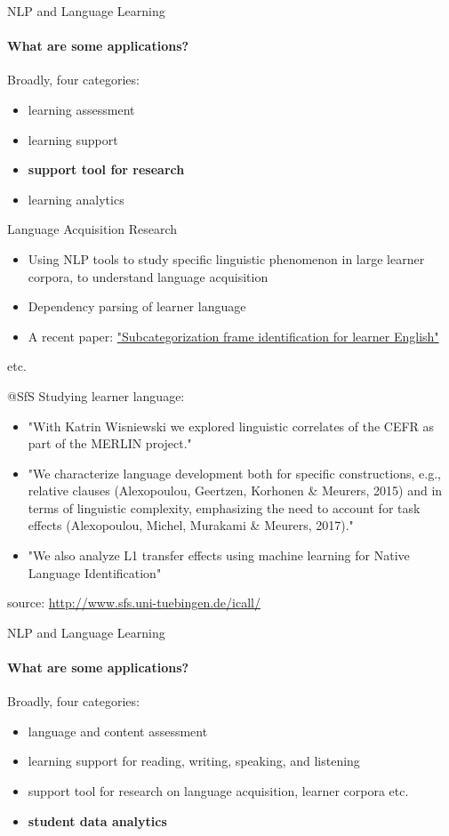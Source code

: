 \documentclass{beamer}
\begin{document}
\begin{frame}{NLP and Language Learning}
\framesubtitle{What are some applications?}
Broadly, four categories:
\begin{itemize}
    \item learning assessment
    \item learning support 
    \item \textbf{support tool for research}
    \item learning analytics
\end{itemize}
\end{frame}

\begin{frame}{Language Acquisition Research}
    \begin{itemize}
        \item Using NLP tools to study specific linguistic phenomenon in large learner corpora, to understand language acquisition
        \item Dependency parsing of learner language
        \item A recent paper: \href{https://www.jbe-platform.com/content/journals/10.1075/ijcl.18097.hua}{"Subcategorization frame identification for learner English"}
    \end{itemize}
    etc. 
\end{frame}

\begin{frame}{@SfS}
Studying learner language: 
    \begin{itemize}
        \item "With Katrin Wisniewski we explored linguistic correlates of the CEFR as part of the MERLIN project."
        \item "We characterize language development both for specific constructions, e.g., relative clauses (Alexopoulou, Geertzen, Korhonen \& Meurers, 2015) and in terms of linguistic complexity, emphasizing the need to account for task effects (Alexopoulou, Michel, Murakami \& Meurers, 2017)."
        \item "We also analyze L1 transfer effects using machine learning for Native Language Identification"
    \end{itemize}
    source: \url{http://www.sfs.uni-tuebingen.de/icall/}
\end{frame}

\begin{frame}{NLP and Language Learning}
\framesubtitle{What are some applications?}
Broadly, four categories:
\begin{itemize}
    \item language and content assessment
    \item learning support for reading, writing, speaking, and listening
    \item support tool for research on language acquisition, learner corpora etc. 
    \item \textbf{student data analytics}
\end{itemize}
\end{frame}
\end{document}
